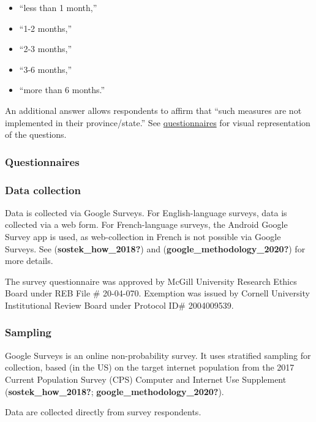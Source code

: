 \documentclass[
]{article}
\providecommand{\tightlist}{%
  \setlength{\itemsep}{0pt}\setlength{\parskip}{0pt}}
\begin{document}
\begin{itemize}
\tightlist
\item
  ``less than 1 month,''
\item
  ``1-2 months,''
\item
  ``2-3 months,''
\item
  ``3-6 months,''
\item
  ``more than 6 months.''
\end{itemize}

An additional answer allows respondents to affirm that ``such measures
are not implemented in their province/state.'' See
\protect\hyperlink{questionnaires}{questionnaires} for visual
representation of the questions.

\hypertarget{questionnaires}{%
\subsubsection{Questionnaires}\label{questionnaires}}

\hypertarget{data-collection}{%
\subsubsection{Data collection}\label{data-collection}}

Data is collected via Google Surveys. For English-language surveys, data
is collected via a web form. For French-language surveys, the Android
Google Survey app is used, as web-collection in French is not possible
via Google Surveys. See (\textbf{sostek\_how\_2018?}) and
(\textbf{google\_methodology\_2020?}) for more details.

The survey questionnaire was approved by McGill University Research
Ethics Board under REB File \# 20-04-070. Exemption was issued by
Cornell University Institutional Review Board under Protocol ID\#
2004009539.

\hypertarget{sampling}{%
\subsubsection{Sampling}\label{sampling}}

Google Surveys is an online non-probability survey. It uses stratified
sampling for collection, based (in the US) on the target internet
population from the 2017 Current Population Survey (CPS) Computer and
Internet Use Supplement (\textbf{sostek\_how\_2018?};
\textbf{google\_methodology\_2020?}).

Data are collected directly from survey respondents.
\end{document}
